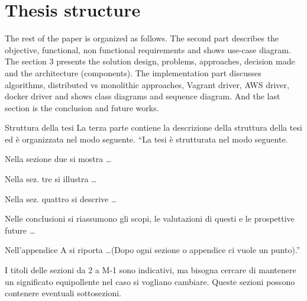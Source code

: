 \section{Thesis structure}
The rest of the paper is organized as follows. The second part describes the objective, functional, non functional requirements and shows use-case diagram.  
The section 3 presents the solution design, problems, approaches, decision made and the architecture (components).
The implementation part discusses algorithms, distributed vs monolithic approaches, Vagrant driver, AWS driver, docker driver and shows class diagrams and sequence diagram. And the last section is the conclusion and future works.

\ifx 
{Struttura della tesi}
La terza parte contiene la descrizione della struttura della tesi ed \`e organizzata nel modo seguente.
``La tesi \`e strutturata nel modo seguente.

Nella sezione due si mostra \dots

Nella sez. tre si illustra \dots

Nella sez. quattro si descrive \dots

Nelle conclusioni si riassumono gli scopi, le valutazioni di questi e le prospettive future \dots

Nell'appendice A si riporta \dots (Dopo ogni sezione o appendice ci vuole un punto).''

I titoli delle sezioni da 2 a M-1 sono indicativi, ma bisogna cercare di mantenere un significato equipollente nel caso si vogliano cambiare. Queste sezioni possono contenere eventuali sottosezioni.
\fi